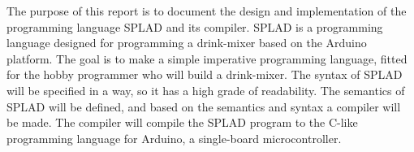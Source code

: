 The purpose of this report is to document the design and implementation of the programming language SPLAD and its compiler. SPLAD is a programming language designed for programming a drink-mixer based on the Arduino platform. The goal is to make a simple imperative programming language, fitted for the hobby programmer who will build a drink-mixer. The syntax of SPLAD will be specified in a way, so it has a high grade of readability. The semantics of SPLAD will be defined, and based on the semantics and syntax a compiler will be made. The compiler will compile the SPLAD program to the C-like programming language for Arduino, a single-board microcontroller.
